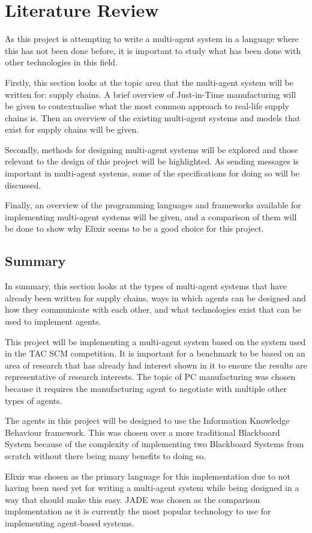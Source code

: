 \section{Literature Review}

As this project is attempting to write a multi-agent system in a language where this has not been done before, it is important to study what has been done with other technologies in this field.

Firstly, this section looks at the topic area that the multi-agent system will be written for: supply chains.
A brief overview of Just-in-Time manufacturing will be given to contextualise what the most common approach to real-life supply chains is.
Then an overview of the existing multi-agent systems and models that exist for supply chains will be given.

Secondly, methods for designing multi-agent systems will be explored and those relevant to the design of this project will be highlighted.
As sending messages is important in multi-agent systems, some of the specifications for doing so will be discussed.

Finally, an overview of the programming languages and frameworks available for implementing multi-agent systems will be given, and a comparison of them will be done to show why Elixir seems to be a good choice for this project.







\subsection{Summary}

In summary, this section looks at the types of multi-agent systems that have already been written for supply chains, ways in which agents can be designed and how they communicate with each other, and what technologies exist that can be used to implement agents.

This project will be implementing a multi-agent system based on the system used in the TAC SCM competition.
It is important for a benchmark to be based on an area of research that has already had interest shown in it to ensure the results are representative of research interests.
The topic of PC manufacturing was chosen because it requires the manufacturing agent to negotiate with multiple other types of agents.

The agents in this project will be designed to use the Information Knowledge Behaviour framework.
This was chosen over a more traditional Blackboard System because of the complexity of implementing two Blackboard Systems from scratch without there being many benefits to doing so.

Elixir was chosen as the primary language for this implementation due to not having been used yet for writing a multi-agent system while being designed in a way that should make this easy.
JADE was chosen as the comparison implementation as it is currently the most popular technology to use for implementing agent-based systems.
